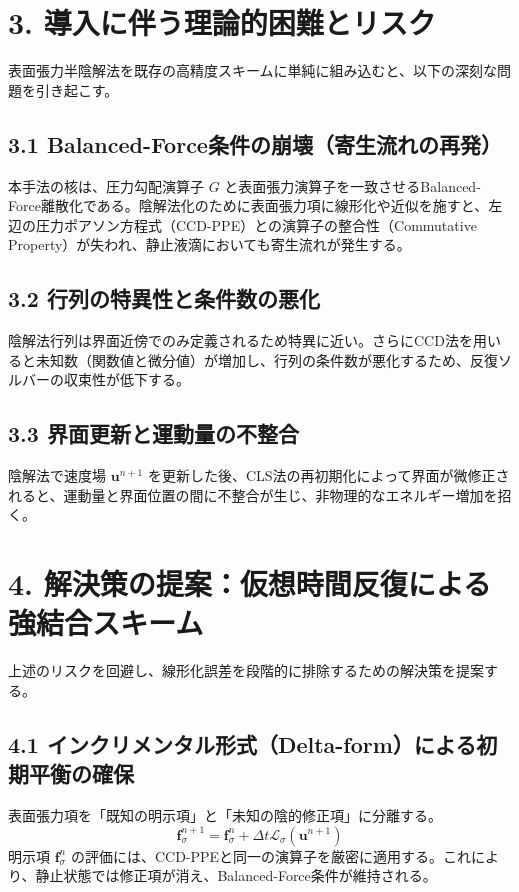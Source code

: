 \documentclass[12pt, a4paper, titlepage]{article}
\begin{document}
\section*{3. 導入に伴う理論的困難とリスク}
表面張力半陰解法を既存の高精度スキームに単純に組み込むと、以下の深刻な問題を引き起こす。

\subsection*{3.1 Balanced-Force条件の崩壊（寄生流れの再発）}
本手法の核は、圧力勾配演算子 $G$ と表面張力演算子を一致させるBalanced-Force離散化である。陰解法化のために表面張力項に線形化や近似を施すと、左辺の圧力ポアソン方程式（CCD-PPE）との演算子の整合性（Commutative Property）が失われ、静止液滴においても寄生流れが発生する。

\subsection*{3.2 行列の特異性と条件数の悪化}
陰解法行列は界面近傍でのみ定義されるため特異に近い。さらにCCD法を用いると未知数（関数値と微分値）が増加し、行列の条件数が悪化するため、反復ソルバーの収束性が低下する。

\subsection*{3.3 界面更新と運動量の不整合}
陰解法で速度場 $\mathbf{u}^{n+1}$ を更新した後、CLS法の再初期化によって界面が微修正されると、運動量と界面位置の間に不整合が生じ、非物理的なエネルギー増加を招く。

\section*{4. 解決策の提案：仮想時間反復による強結合スキーム}
上述のリスクを回避し、線形化誤差を段階的に排除するための解決策を提案する。

\subsection*{4.1 インクリメンタル形式（Delta-form）による初期平衡の確保}
表面張力項を「既知の明示項」と「未知の陰的修正項」に分離する。$$\mathbf{f}_{\sigma}^{n+1} = \mathbf{f}_{\sigma}^{n} + \Delta t \mathcal{L}_{\sigma}(\mathbf{u}^{n+1})$$明示項 $\mathbf{f}_{\sigma}^{n}$ の評価には、CCD-PPEと同一の演算子を厳密に適用する。これにより、静止状態では修正項が消え、Balanced-Force条件が維持される。
\end{document}

